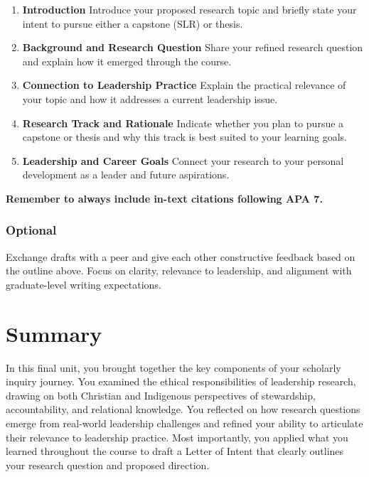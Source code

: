 \documentclass[
  letterpaper,
  DIV=11,
  numbers=noendperiod]{scrreprt}
\providecommand{\tightlist}{%
  \setlength{\itemsep}{0pt}\setlength{\parskip}{0pt}}\usepackage{longtable,booktabs,array}
\begin{document}
\begin{enumerate}
\def\labelenumi{\arabic{enumi}.}
\tightlist
\item
  \textbf{Introduction} Introduce your proposed research topic and
  briefly state your intent to pursue either a capstone (SLR) or thesis.
\item
  \textbf{Background and Research Question} Share your refined research
  question and explain how it emerged through the course.
\item
  \textbf{Connection to Leadership Practice} Explain the practical
  relevance of your topic and how it addresses a current leadership
  issue.
\item
  \textbf{Research Track and Rationale} Indicate whether you plan to
  pursue a capstone or thesis and why this track is best suited to your
  learning goals.
\item
  \textbf{Leadership and Career Goals} Connect your research to your
  personal development as a leader and future aspirations.
\end{enumerate}

\textbf{Remember to always include in-text citations following APA 7.}

\subsubsection*{Optional}\label{optional}

Exchange drafts with a peer and give each other constructive feedback
based on the outline above. Focus on clarity, relevance to leadership,
and alignment with graduate-level writing expectations.

\section*{Summary}\label{summary-5}


In this final unit, you brought together the key components of your
scholarly inquiry journey. You examined the ethical responsibilities of
leadership research, drawing on both Christian and Indigenous
perspectives of stewardship, accountability, and relational knowledge.
You reflected on how research questions emerge from real-world
leadership challenges and refined your ability to articulate their
relevance to leadership practice. Most importantly, you applied what you
learned throughout the course to draft a Letter of Intent that clearly
outlines your research question and proposed direction.
\end{document}
